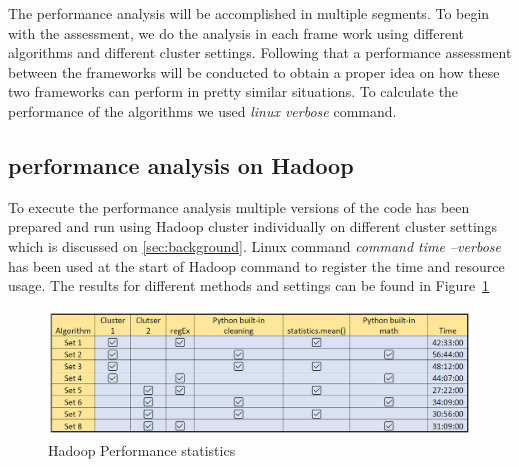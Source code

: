 The performance analysis will be accomplished in multiple segments. To begin with the assessment, we do the analysis in each frame work using different algorithms and different cluster settings. Following that a performance assessment between the frameworks will be conducted to obtain a  proper idea on how these two frameworks can perform in pretty similar situations. To calculate the performance of the algorithms we used \emph{linux verbose} command.

\subsection{performance analysis on Hadoop}
To execute the performance analysis multiple versions of the code has been prepared and run using Hadoop cluster individually on different cluster settings which is discussed on \ref{sec:background}. Linux command \emph{command time --verbose} has been used at the start of Hadoop command to register the time and resource usage. The results for different methods and settings can be found in Figure~\ref{fig:hPerformance}


\begin{figure}[t]
   \centering
   \includegraphics[width=\linewidth]{fig/hPerformance.png}
    \caption{Hadoop Performance statistics}
    \label{fig:hPerformance}
\end{figure}